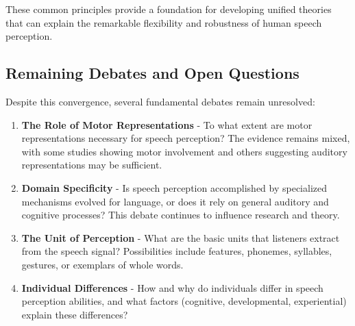 \documentclass[12pt,a4paper]{article}
\begin{document}
These common principles provide a foundation for developing unified theories that can explain the remarkable flexibility and robustness of human speech perception.

\subsection{Remaining Debates and Open Questions}

Despite this convergence, several fundamental debates remain unresolved:

\begin{enumerate}
\item \textbf{The Role of Motor Representations} - To what extent are motor representations necessary for speech perception? The evidence remains mixed, with some studies showing motor involvement and others suggesting auditory representations may be sufficient.

\item \textbf{Domain Specificity} - Is speech perception accomplished by specialized mechanisms evolved for language, or does it rely on general auditory and cognitive processes? This debate continues to influence research and theory.

\item \textbf{The Unit of Perception} - What are the basic units that listeners extract from the speech signal? Possibilities include features, phonemes, syllables, gestures, or exemplars of whole words.

\item \textbf{Individual Differences} - How and why do individuals differ in speech perception abilities, and what factors (cognitive, developmental, experiential) explain these differences?
\end{enumerate}
\end{document}
